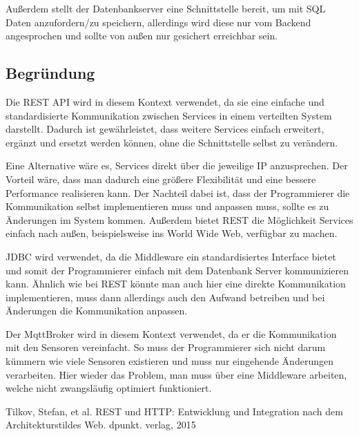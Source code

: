 \documentclass[runningheads]{llncs}
\begin{document}
Außerdem stellt der Datenbankserver eine Schnittstelle bereit, um mit SQL Daten anzufordern/zu speichern, allerdings wird diese nur vom Backend angesprochen und sollte von außen nur gesichert erreichbar sein. \\

\subsection{Begründung}
Die REST API wird in diesem Kontext verwendet, da sie eine einfache und standardisierte Kommunikation zwischen Services in einem verteilten System darstellt.
Dadurch ist gewährleistet, dass weitere Services einfach erweitert, ergänzt und ersetzt werden können, ohne die Schnittstelle selbst zu verändern.

Eine Alternative wäre es, Services direkt über die jeweilige IP anzusprechen.
Der Vorteil wäre, dass man dadurch eine größere Flexibilität und eine bessere Performance realisieren kann.
Der Nachteil dabei ist, dass der Programmierer die Kommunikation selbst implementieren muss und anpassen muss, sollte es zu Änderungen im System kommen.
Außerdem bietet REST die Möglichkeit Services einfach nach außen, beispielsweise ins World Wide Web, verfügbar zu machen.

JDBC wird verwendet, da die Middleware ein standardisiertes Interface bietet und somit der Programmierer einfach mit dem Datenbank Server kommunizieren kann.
Ähnlich wie bei REST könnte man auch hier eine direkte Kommunikation implementieren, muss dann allerdings auch den Aufwand betreiben und bei Änderungen die Kommunikation anpassen.

Der MqttBroker wird in diesem Kontext verwendet, da er die Kommunikation mit den Sensoren vereinfacht.
So muss der Programmierer sich nicht darum kümmern wie viele Sensoren existieren und muss nur eingehende Änderungen verarbeiten.
Hier wieder das Problem, man muss über eine Middleware arbeiten, welche nicht zwangsläufig optimiert funktioniert.


\newpage

Tilkov, Stefan, et al. REST und HTTP: Entwicklung und 
Integration nach dem Architekturstildes Web. dpunkt. verlag, 
2015

\end{document}
